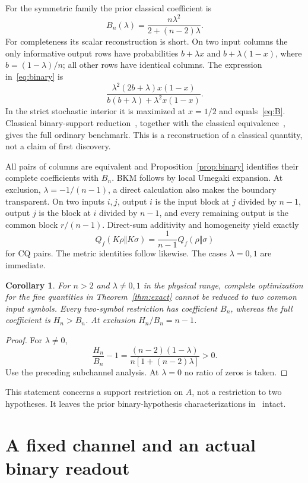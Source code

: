 \documentclass[11pt]{article}
\newtheorem{corollary}[theorem]{Corollary}
\theoremstyle{remark}\newtheorem{remark}[theorem]{Remark}
\begin{document}
For the symmetric family the prior classical coefficient is
\begin{equation}\label{eq:B}
 B_n(\lambda)=\frac{n\lambda^2}{2+(n-2)\lambda}.
\end{equation}
For completeness its scalar reconstruction is short. On two input columns the only informative output rows have probabilities $b+\lambda x$ and $b+\lambda(1-x)$, where $b=(1-\lambda)/n$; all other rows have identical columns. The expression in~\eqref{eq:binary} is
\[
 \frac{\lambda^2(2b+\lambda)x(1-x)}
 {b(b+\lambda)+\lambda^2x(1-x)}.
\]
In the strict stochastic interior it is maximized at $x=1/2$ and equals~\eqref{eq:B}. Classical binary-support reduction~\cite{OP}, together with the classical equivalence~\cite{MZ}, gives the full ordinary benchmark. This is a reconstruction of a classical quantity, not a claim of first discovery.

All pairs of columns are equivalent and Proposition~\ref{prop:binary} identifies their complete coefficients with $B_n$. BKM follows by local Umegaki expansion. At exclusion, $\lambda=-1/(n-1)$, a direct calculation also makes the boundary transparent. On two inputs $i,j$, output $i$ is the input block at $j$ divided by $n-1$, output $j$ is the block at $i$ divided by $n-1$, and every remaining output is the common block $r/(n-1)$. Direct-sum additivity and homogeneity yield exactly
\[
 Q_f(K\rho\Vert K\sigma)=\frac1{n-1}Q_f(\rho\Vert\sigma)
\]
for CQ pairs. The metric identities follow likewise. The cases $\lambda=0,1$ are immediate.

\begin{corollary}\label{cor:failure}
For $n>2$ and $\lambda\ne0,1$ in the physical range, complete optimization for the five quantities in Theorem~\ref{thm:exact} cannot be reduced to two common input symbols. Every two-symbol restriction has coefficient $B_n$, whereas the full coefficient is $H_n>B_n$. At exclusion $H_n/B_n=n-1$.
\end{corollary}
\begin{proof}
For $\lambda\ne0$,
\[
 \frac{H_n}{B_n}-1=\frac{(n-2)(1-\lambda)}{n[1+(n-2)\lambda]}>0.
\]
Use the preceding subchannel analysis. At $\lambda=0$ no ratio of zeros is taken.
\end{proof}
This statement concerns a support restriction on $A$, not a restriction to two hypotheses. It leaves the prior binary-hypothesis characterizations in~\cite{HGNW} intact.

\section{A fixed channel and an actual binary readout}
\end{document}
